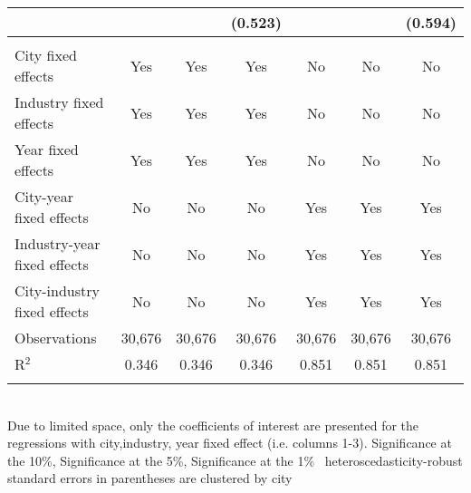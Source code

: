 \documentclass[12pt]{article}
\begin{document}
\begin{table}[!htbp]
\begin{adjustbox}{width=\textwidth, totalheight=\baselineskip,keepaspectratio}
\begin{tabular}{@{\extracolsep{5pt}}lcccccc}
  &  &  & (0.523) &  &  & (0.594) \\ 
 \hline \\[-1.8ex] 
City fixed effects & Yes & Yes & Yes & No & No & No \\ 
Industry fixed effects & Yes & Yes & Yes & No & No & No \\ 
Year fixed effects & Yes & Yes & Yes & No & No & No \\ 
City-year fixed effects & No & No & No & Yes & Yes & Yes \\ 
Industry-year fixed effects & No & No & No & Yes & Yes & Yes \\ 
City-industry fixed effects & No & No & No & Yes & Yes & Yes \\ 
Observations & 30,676 & 30,676 & 30,676 & 30,676 & 30,676 & 30,676 \\ 
R$^{2}$ & 0.346 & 0.346 & 0.346 & 0.851 & 0.851 & 0.851 \\ 
\hline 
\hline \\[-1.8ex] 
\end{tabular}
\end{adjustbox}
\begin{tablenotes} 
 \small 
 \item \\ 
\footnotesize{
Due to limited space, only the coefficients of interest are presented 
for the regressions with city,industry, year fixed effect (i.e. columns 1-3).
\sym{*} Significance at the 10\%, \sym{**} Significance at the 5\%, \sym{***} Significance at the 1\% \
heteroscedasticity-robust standard errors in parentheses are clustered by city 
}
 
\end{tablenotes}
\end{table}
\end{document}
